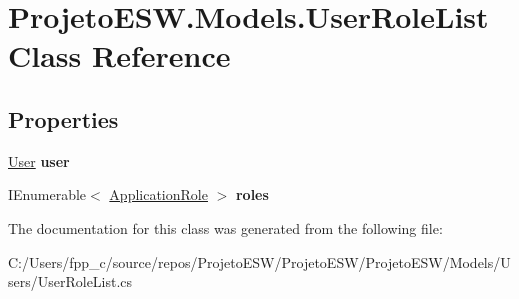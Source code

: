 \hypertarget{class_projeto_e_s_w_1_1_models_1_1_user_role_list}{}\section{Projeto\+E\+S\+W.\+Models.\+User\+Role\+List Class Reference}
\label{class_projeto_e_s_w_1_1_models_1_1_user_role_list}
\subsection*{Properties}
\begin{DoxyCompactItemize}
\item 
\mbox{\label{class_projeto_e_s_w_1_1_models_1_1_user_role_list_a1f61b20a3a2e7eb389b06eebd625da7c}} 
\mbox{\hyperlink{class_projeto_e_s_w_1_1_models_1_1_user}{User}} {\bfseries user}
\item 
\mbox{\label{class_projeto_e_s_w_1_1_models_1_1_user_role_list_a0a3b65f2bbee3f48f9d70783e1bd2168}} 
I\+Enumerable$<$ \mbox{\hyperlink{class_projeto_e_s_w_1_1_models_1_1_application_role}{Application\+Role}} $>$ {\bfseries roles}
\end{DoxyCompactItemize}


The documentation for this class was generated from the following file\+:\begin{DoxyCompactItemize}
\item 
C\+:/\+Users/fpp\+\_\+c/source/repos/\+Projeto\+E\+S\+W/\+Projeto\+E\+S\+W/\+Projeto\+E\+S\+W/\+Models/\+Users/User\+Role\+List.\+cs\end{DoxyCompactItemize}

